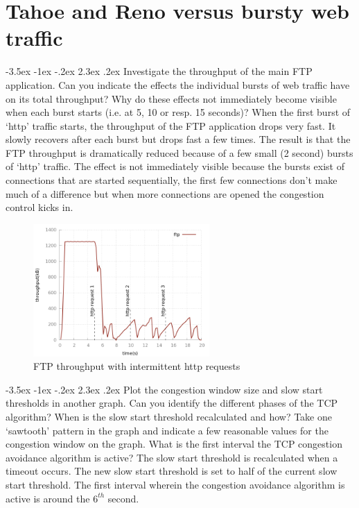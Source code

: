 \documentclass[9pt, a4paper, oneside]{article}
\makeatletter
\renewcommand\subsection{\@startsection{subsection}{2}{\z@}
    {-3.5ex \@plus -1ex \@minus -.2ex}
    {2.3ex \@plus.2ex}
    {\normalfont\normalsize\bfseries}}
\makeatother
\begin{document}
\newpage

\section{Tahoe and Reno versus bursty web traffic}

\subsection{Investigate the throughput of the main FTP application.
    Can you indicate the effects the individual bursts of web traffic have
    on its total throughput?
    Why do these effects not immediately become visible when each burst starts
    (i.e. at 5, 10 or resp. 15 seconds)?}
When the first burst of `http' traffic starts, the throughput of the FTP
application drops very fast.
It slowly recovers after each burst but drops fast a few times.
The result is that the FTP throughput is dramatically reduced because of a
few small (2 second) bursts of `http' traffic.
The effect is not immediately visible because the bursts exist of connections
that are started sequentially, the first few connections don't make much of a
difference but when more connections are opened the congestion control kicks in.

\begin{figure}[h]
\centering
\includegraphics[width=0.6\textwidth]{ftp_3http.png}
\caption{FTP throughput with intermittent http requests}
\label{ftp_3http}
\end{figure}

\subsection{Plot the congestion window size and slow start thresholds in
    another graph.
    Can you identify the different phases of the TCP algorithm?
    When is the slow start threshold recalculated and how?
    Take one `sawtooth' pattern in the graph and indicate a few reasonable
    values for the congestion window on the graph.
    What is the first interval the TCP congestion avoidance algorithm is
    active?}
The slow start threshold is recalculated when a timeout occurs.
The new slow start threshold is set to half of the current slow start threshold.
The first interval wherein the congestion avoidance algorithm is active is
around the $6^{th}$ second.
\end{document}

